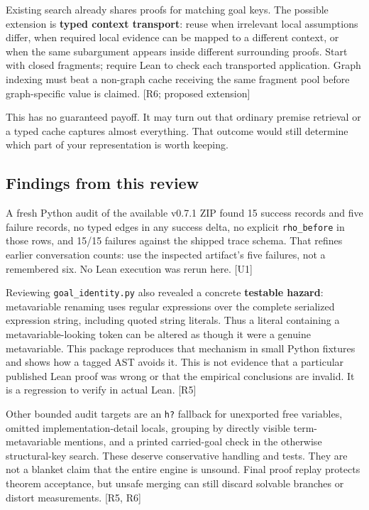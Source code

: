 \documentclass[
  10pt,
]{article}
\begin{document}
Existing search already shares proofs for matching goal keys. The
possible extension is \textbf{typed context transport}: reuse when
irrelevant local assumptions differ, when required local evidence can be
mapped to a different context, or when the same subargument appears
inside different surrounding proofs. Start with closed fragments;
require Lean to check each transported application. Graph indexing must
beat a non-graph cache receiving the same fragment pool before
graph-specific value is claimed. {[}R6; proposed extension{]}

This has no guaranteed payoff. It may turn out that ordinary premise
retrieval or a typed cache captures almost everything. That outcome
would still determine which part of your representation is worth
keeping.

\subsection{Findings from this review}\label{findings-from-this-review}

A fresh Python audit of the available v0.7.1 ZIP found 15 success
records and five failure records, no typed edges in any success delta,
no explicit \texttt{rho\_before} in those rows, and 15/15 failures
against the shipped trace schema. That refines earlier conversation
counts: use the inspected artifact's five failures, not a remembered
six. No Lean execution was rerun here. {[}U1{]}

Reviewing \texttt{goal\_identity.py} also revealed a concrete
\textbf{testable hazard}: metavariable renaming uses regular expressions
over the complete serialized expression string, including quoted string
literals. Thus a literal containing a metavariable-looking token can be
altered as though it were a genuine metavariable. This package
reproduces that mechanism in small Python fixtures and shows how a
tagged AST avoids it. This is not evidence that a particular published
Lean proof was wrong or that the empirical conclusions are invalid. It
is a regression to verify in actual Lean. {[}R5{]}

Other bounded audit targets are an \texttt{h?} fallback for unexported
free variables, omitted implementation-detail locals, grouping by
directly visible term-metavariable mentions, and a printed carried-goal
check in the otherwise structural-key search. These deserve conservative
handling and tests. They are not a blanket claim that the entire engine
is unsound. Final proof replay protects theorem acceptance, but unsafe
merging can still discard solvable branches or distort measurements.
{[}R5, R6{]}
\end{document}
